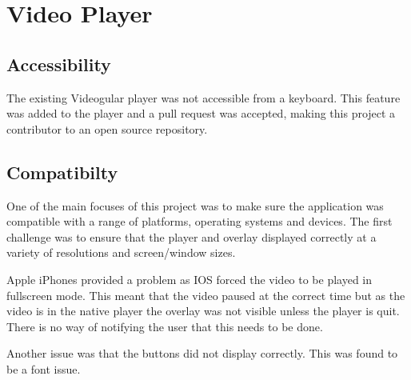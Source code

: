 \chapter{Video Player} 
\label{Chapter:Video Player}
\section{Accessibility} 
\label{Section:Accessibility}
The existing Videogular player was not accessible from a keyboard. This feature was added to the player and a pull request was accepted, making this project a contributor to an open source repository. 
\section{Compatibilty} 
\label{Section:Compatibility}
One of the main focuses of this project was to make sure the application was compatible with a range of platforms, operating systems and devices. The first challenge was to ensure that the player and overlay displayed correctly at a variety of resolutions and screen/window sizes. 

Apple iPhones provided a problem as IOS forced the video to be played in fullscreen mode. This meant that the video paused at the correct time but as the video is in the native player the overlay was not visible unless the player is quit. There is no way of notifying the user that this needs to be done.

Another issue was that the buttons did not display correctly. This was found to be a font issue.